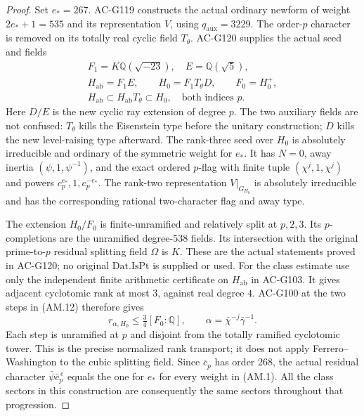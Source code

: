 \begin{proof}
Set \(e_*=267\).  AC-G119 constructs the actual ordinary
newform of weight \(2e_*+1=535\) and its representation \(V\), using
\(q_{\mathrm{aux}}=3229\).  The order-\(p\) character is
removed on its totally real cyclic field \(T_\theta\).
AC-G120 supplies the actual seed and fields
\[
 \begin{gathered}
 F_1=K\mathbb Q(\sqrt{-23}),\quad E=\mathbb Q(\sqrt5),\\
 H_{\mathrm{ab}}=F_1E,\qquad
 H_0=F_1T_\theta D,\qquad F_0=H_0^+,\\
 H_{\mathrm{ab}}\subset H_{\mathrm{ab}}T_\theta\subset H_0,
                     \quad\text{both indices }p .
 \end{gathered}
 \tag{AM.12}
\]
Here \(D/E\) is the new cyclic ray extension of degree \(p\).
The two auxiliary fields are not confused: \(T_\theta\) kills
the Eisenstein type before the unitary construction; \(D\)
kills the new level-raising type afterward.
The rank-three seed over \(H_0\) is absolutely irreducible
and ordinary of the symmetric weight for \(e_*\).
It has \(N=0\), away inertia \((\psi,1,\psi^{-1})\), and
the exact ordered \(p\)-flag with finite tuple
\((\chi^j,1,\chi^j)\) and powers \(c_p^{e_*},1,c_p^{-e_*}\).
The rank-two representation \(V|_{G_{H_0}}\) is absolutely
irreducible and has the corresponding rational two-character
flag and away type.

The extension \(H_0/F_0\) is finite-unramified and relatively
split at \(p,2,3\).  Its \(p\)-completions are the unramified
degree-\(538\) fields.  Its intersection with the original
prime-to-\(p\) residual splitting field \(\Omega\) is \(K\).
These are the actual statements proved in AC-G120; no
original \(\mathrm{Dat.IsPt}\) is supplied or used.
For the class estimate use only the independent finite
arithmetic certificate on \(H_{\mathrm{ab}}\) in AC-G103.
It gives adjacent cyclotomic rank at most \(3\), against
real degree \(4\).  AC-G100 at the two steps in (AM.12)
therefore gives
\[
                 r_{\alpha,H_0}\le \tfrac34[F_0:\mathbb Q],
 \qquad \alpha=\bar\chi^{-j}\bar\gamma^{-1}.
 \tag{AM.13}
\]
Each step is unramified at \(p\) and disjoint from the
totally ramified cyclotomic tower.  This is the precise
normalized rank transport; it does not apply
Ferrero--Washington to the cubic splitting field.
Since \(\bar c_p\) has order \(268\), the actual residual
character \(\bar\psi\bar c_p^{\,e}\) equals the one for
\(e_*\) for every weight in (AM.1).
All the class sectors in this construction are consequently
the same sectors throughout that progression.


\end{proof}
